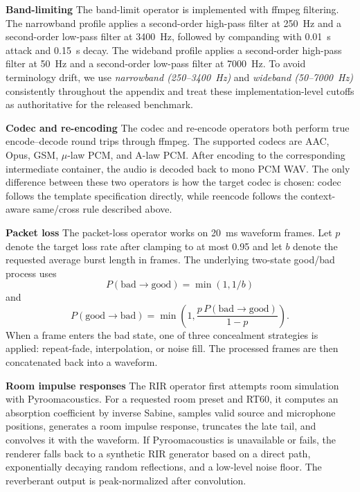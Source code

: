 \noindent\textbf{Band-limiting} The band-limit operator is implemented with ffmpeg filtering. The narrowband profile applies a second-order high-pass filter at 250~Hz and a second-order low-pass filter at 3400~Hz, followed by companding with 0.01~s attack and 0.15~s decay. The wideband profile applies a second-order high-pass filter at 50~Hz and a second-order low-pass filter at 7000~Hz. To avoid terminology drift, we use \emph{narrowband (250--3400~Hz)} and \emph{wideband (50--7000~Hz)} consistently throughout the appendix and treat these implementation-level cutoffs as authoritative for the released benchmark.

\noindent\textbf{Codec and re-encoding} The codec and re-encode operators both perform true encode--decode round trips through ffmpeg. The supported codecs are AAC, Opus, GSM, $\mu$-law PCM, and A-law PCM. After encoding to the corresponding intermediate container, the audio is decoded back to mono PCM WAV. The only difference between these two operators is how the target codec is chosen: codec follows the template specification directly, while reencode follows the context-aware same/cross rule described above.

\noindent\textbf{Packet loss} The packet-loss operator works on 20~ms waveform frames. Let $p$ denote the target loss rate after clamping to at most 0.95 and let $b$ denote the requested average burst length in frames. The underlying two-state good/bad process uses
\begin{equation}
P(\mathrm{bad}\rightarrow\mathrm{good}) = \min(1, 1/b)
\label{eq:plr_bad_to_good}
\end{equation}
and
\begin{equation}
P(\mathrm{good}\rightarrow\mathrm{bad}) = \min\!\left(1, \frac{p\,P(\mathrm{bad}\rightarrow\mathrm{good})}{1-p}\right).
\label{eq:plr_good_to_bad}
\end{equation}
When a frame enters the bad state, one of three concealment strategies is applied: repeat-fade, interpolation, or noise fill. The processed frames are then concatenated back into a waveform.

\noindent\textbf{Room impulse responses} The RIR operator first attempts room simulation with Pyroomacoustics. For a requested room preset and RT60, it computes an absorption coefficient by inverse Sabine, samples valid source and microphone positions, generates a room impulse response, truncates the late tail, and convolves it with the waveform. If Pyroomacoustics is unavailable or fails, the renderer falls back to a synthetic RIR generator based on a direct path, exponentially decaying random reflections, and a low-level noise floor. The reverberant output is peak-normalized after convolution.

